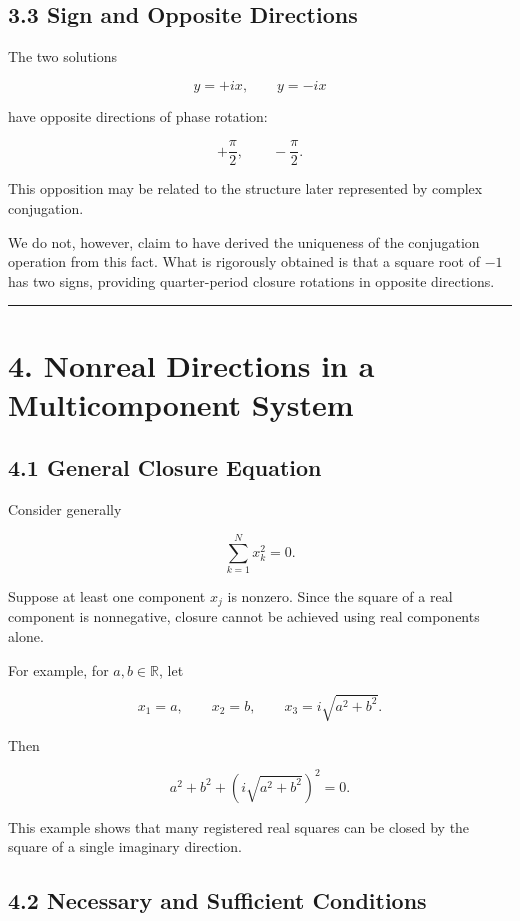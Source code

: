 \documentclass[
  a4paper,
  10pt]{article}
\begin{document}
\subsection{3.3 Sign and Opposite
Directions}\label{33-sign-and-opposite-directions}

The two solutions

\[
y=+ix,
\qquad
y=-ix
\]

have opposite directions of phase rotation:

\[
+\frac{\pi}{2},
\qquad
-\frac{\pi}{2}.
\]

This opposition may be related to the structure later represented by
complex conjugation.

We do not, however, claim to have derived the uniqueness of the
conjugation operation from this fact. What is rigorously obtained is
that a square root of \(-1\) has two signs, providing quarter-period
closure rotations in opposite directions.

\begin{center}\rule{0.5\linewidth}{0.5pt}\end{center}

\section{4. Nonreal Directions in a Multicomponent
System}\label{4-nonreal-directions-in-a-multicomponent-system}

\subsection{4.1 General Closure
Equation}\label{41-general-closure-equation}

Consider generally

\[
\sum_{k=1}^{N}x_k^2=0.
\]

Suppose at least one component \(x_j\) is nonzero. Since the square of a
real component is nonnegative, closure cannot be achieved using real
components alone.

For example, for \(a,b\in\mathbb R\), let

\[
x_1=a,
\qquad
x_2=b,
\qquad
x_3=i\sqrt{a^2+b^2}.
\]

Then

\[
a^2+b^2+
\left(i\sqrt{a^2+b^2}\right)^2
=0.
\]

This example shows that many registered real squares can be closed by
the square of a single imaginary direction.

\subsection{4.2 Necessary and Sufficient
Conditions}\label{42-necessary-and-sufficient-conditions}
\end{document}
